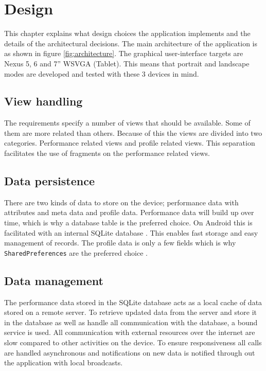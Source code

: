 \chapter{Design}
This chapter explains what design choices the application implements and the details of the architectural decisions. The main architecture of the application is as shown in figure \ref{fig:architecture}. The graphical user-interface targets are Nexus 5, 6 and 7'' WSVGA (Tablet). This means that portrait and landscape modes are developed and tested with these 3 devices in mind.

\section{View handling}
The requirements specify a number of views that should be available. Some of them are more related than others. Because of this the views are divided into two categories. Performance related views and profile related views. This separation facilitates the use of fragments on the performance related views.

\section{Data persistence}
There are two kinds of data to store on the device; performance data with attributes and meta data and profile data. Performance data will build up over time, which is why a database table is the preferred choice. On Android this is facilitated with an internal SQLite database \citep{android:sqlite}. This enables fast storage and easy management of records. The profile data is only a few fields which is why \verb|SharedPreferences| are the preferred choice \citep{android:sharedprefs}.

\section{Data management}
The performance data stored in the SQLite database acts as a local cache of data stored on a remote server. To retrieve updated data from the server and store it in the database as well as handle all communication with the database, a bound service is used. All communication with external resources over the internet are slow compared to other activities on the device. To ensure responsiveness all calls are handled asynchronous and notifications on new data is notified through out the application with local broadcasts.


